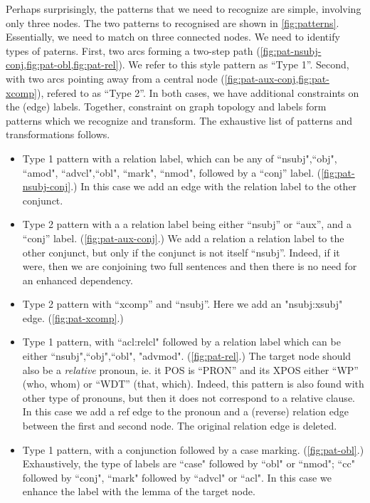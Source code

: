 \documentclass[11pt,a4paper]{article}
\begin{document}
Perhaps surprisingly, the patterns that we need to recognize are
simple, involving only three nodes. The two patterns to recognised are
shown in \cref{fig:patterns}. Essentially, we need to match on three
connected nodes.  We need to identify types of paterns. First, two
arcs forming a two-step path
(\cref{fig:pat-nsubj-conj,fig:pat-obl,fig:pat-rel}). We refer to this
style pattern as ``Type 1''.  Second, with two arcs pointing away from
a central node (\cref{fig:pat-aux-conj,fig:pat-xcomp}), refered to as
``Type 2''.
In both cases, we have additional constraints on the (edge) labels. Together, constraint
on graph topology and labels form patterns which we recognize and transform.
The exhaustive list of patterns and transformations follows.
\begin{itemize}
\item Type 1 pattern with a relation label, which can be any of
  ``nsubj",``obj", ``amod", ``advcl",``obl", ``mark", ``nmod", followed by a
  ``conj'' label. (\cref{fig:pat-nsubj-conj}.) In this case we add an
  edge with the relation label to the other conjunct.
\item Type 2 pattern with a a relation label being either ``nsubj'' or
  ``aux'', and a ``conj'' label. (\cref{fig:pat-aux-conj}.) We add a relation a relation label to
  the other conjunct, but only if the conjunct is not itself
  ``nsubj''. Indeed, if it were, then we are conjoining two full
  sentences and then there is no need for an enhanced dependency.
\item Type 2 pattern with ``xcomp'' and ``nsubj''. Here we add an
  "nsubj:xsubj" edge. (\cref{fig:pat-xcomp}.)
\item Type 1 pattern, with ``acl:relcl" followed by a relation label
  which can be either ``nsubj",``obj",``obl",
  "advmod". (\cref{fig:pat-rel}.) The target node should also be a
  \emph{relative} pronoun, ie. it POS is ``PRON'' and its XPOS either
  ``WP'' (who, whom) or ``WDT'' (that, which). Indeed, this pattern is
  also found with other type of pronouns, but then it does not
  correspond to a relative clause.  In this case we add a ref edge to
  the pronoun and a (reverse) relation edge between the first and
  second node. The original relation edge is deleted.
\item Type 1 pattern, with a conjunction followed by a case
  marking. (\cref{fig:pat-obl}.) Exhaustively, the type of labels are ``case" followed by
  ``obl" or ``nmod"; ``cc" followed by ``conj", ``mark" followed by ``advcl"
  or ``acl". In this case we enhance the label with the lemma of the target node.
\end{itemize}
\end{document}
